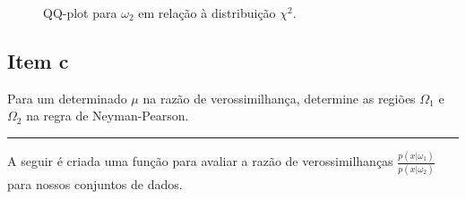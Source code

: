 \documentclass[
  a4paperpaper,
]{article}
\begin{document}
\begin{figure}[H]


\caption{\label{fig-qqchisq2}QQ-plot para \(\omega_2\) em relação à
distribuição \(\chi^2\).}

\end{figure}%

\subsection{Item c}\label{item-c}

Para um determinado \(\mu\) na razão de verossimilhança, determine as
regiões \(\Omega_1\) e \(\Omega_2\) na regra de Neyman-Pearson.

\begin{center}\rule{0.5\linewidth}{0.5pt}\end{center}

A seguir é criada uma função para avaliar a razão de verossimilhanças
\(\frac{p(x| \omega_1)}{p(x| \omega_2)}\) para nossos conjuntos de
dados.
\end{document}

